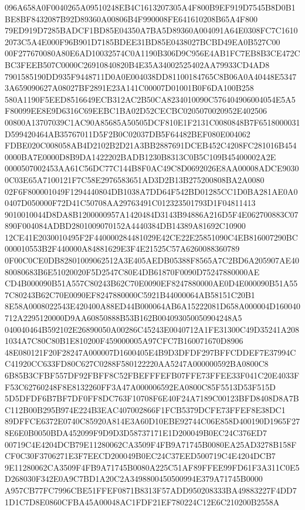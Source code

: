 \documentclass[UTF8,fontset=fandol,zihao=-4,a4paper]{ctexart}
\begin{document}
{{096A658A0F0040265A09510248EB4C1613207305A4F800B9EF919D7545B8D0B1BE8BF8432087B92D89360A00806B4F990008FE641610208B65A4F800
79ED919D7285BADCF1BD85E04350A7BA5D89360A004091A64E0308FC7C16102073C5A4E000F96B901D7185BDEE31BD85E0438027BCBD49EA0B527C00
00F277670080A80E6AD10032574C0A1190B306D9C956E4AB1FC7EB8B3CE472CBC3FEEB507C0000C26910840820B4E35A34002525402AA79933CD4AD8
7901585190DD935F9448711D0A0E004038DD81100184765C8B06A0A40448E53473A659090627A08027BF2891E23A141C00007D01001B0F6DA100B258
580A1190F5EED8516649ECB312AC2B50CA8234010090C576404906004054E5A5F80099EE8E9D6316C69EEBC1BA02D52CECBC0205070020952E402506
00800A13707039C1AC90A85685A50505DCF810E1F2131C0080848B7F6518000031D599420464AB35767011D5F2B0C02037DB5F64482BEF080E004062
FDBE020C008058AB4D2102B2D21A3BB2887691DCEB452C4208FC281016B4540000BA7E0000D8B9DA1422202BADB1230B8313C0B5C109B45400002A2E
0000507002453AA61C56DC77C144B8F0AC49C8D0692026E8AA00008ADCE90300C03E65A7100121F7C58E2976583651AD3D2B13B275200808BA2A0080
02F6F800001049F1294440804DB1038A7DD64F542BD01285CC1D0BA281AE0A00407D050000F72D41C50708AA29763491C012323501793D1F04811413
9010010044D8DA8B1200000957A1420484D3143B94886A216D5F4E062700883C07890F004084ADBD2801009070152A4440384DB14389A81692C10900
12CE41E2030010495F2F440000284481029E42CE22E25851090C4EB816007290BC000010553B2F440000A84881629E3F4E21525C57A6260088360789
0F00C0CE0DB82801009062512A3E405AEDB05388F8565A7C2BD6A205907AE4080080683B6E51020020F5D2547C80E4DB61870F0090D75247880000AE
CD4B000090B51A557C80243B62C70E0090EF8247880000AE0D4E000090B51A557C80243B62C70E0090EF8247880000C5921B44000064AB58151C20B1
8E58A0008022543E420400A88ED44B000064AB6A15222081D658A000004D160040712A2295120000D9AA60850888B53B162B004093050050904248A5
040040464B592102E26890050A00286C45243E0040712A1FE31300C49D35241A2081034A7C80C80B1E810200F459000005A97CFC7B160071670D8906
48E080121F20F28247A000007D1600405E4B9D3DFDF297BFFCDDEF7E37994CC41920CC633FD80C627C0288F580122220AA5247A000000592BA0800C8
6B85B3CFBF557DF92FBFF8C52FBEFFFEFB07FFE73FFEE33F041C20E4033FF53C62760248F8E8132260FF3A47A000006592EA0800C85F5513D53F515D
5D5DFDF6B7BF7DF0FF8DC763F10708F6E40F24A7189C00123BFD8408D8A7BC112B00B295B974E224B3EAC407002866F1FCB5379DCFE73FFEF8E38DC1
89DFFCE6372E0740C85920A814E3A60D10EBE92744C06E858D400190D1965F278E6E0B0050BDA452099F9D9D3D58737171E1D200049B0EC24C376ED7
00719C4E4204DCB79E11280062CA3509F4FB9A71745B0080EA25AD3278B158FCF0C30F3706271E3F7EECD200049B0EC24C37EED500719C4E4204DCB7
9E11280062CA3509F4FB9A71745B0080A225C51AF89FFEE99FD61F3A311C0E5D268030F342E0A9C7BD1A20C2A3498800450500994E379A71745B0000
A957CB77FC7996CBE51FFEF0871B8313F57ADD950208333BA49883227F4DD71D1C7D8E0860CFBA45A00048AC1FDF21EF780224C12E6C210200B2558A
}}
\end{document}
